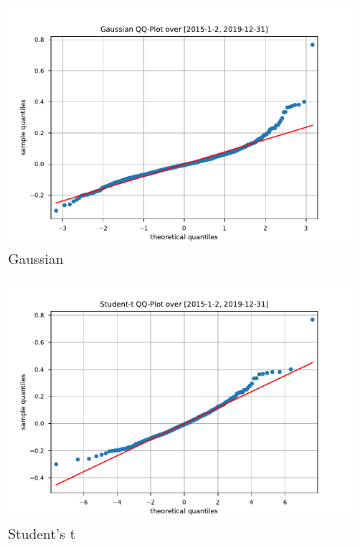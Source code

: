 \begin{figure}[htbp]
    \centering
    \begin{subfigure}[b]{0.32\textwidth}
        \centering
        \includegraphics[width=\textwidth]{content/reschap4/Figures/gauss_QQ_2015-1-2-2019-12-31.pdf}
        \caption{Gaussian}
    \end{subfigure}
    \hfill
    \begin{subfigure}[b]{0.32\textwidth}
        \centering
        \includegraphics[width=\textwidth]{content/reschap4/Figures/student_QQ_2015-1-2-2019-12-31.pdf}
        \caption{Student's t}
    \end{subfigure}
    \hfill
    \begin{subfigure}[b]{0.32\textwidth}
        \centering

\end{subfigure}
\end{figure}
